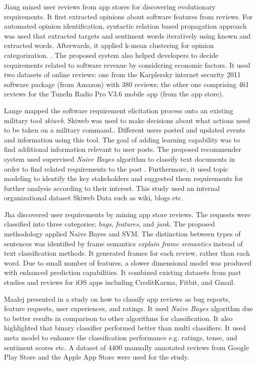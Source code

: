 	Jiang \etal \cite{Jiang:2014} mined user reviews from 
app stores for discovering evolutionary requirements. It first extracted opinions about software features from reviews. For automated opinion identification, syntactic
relation based propagation approach was used that extracted targets and sentiment words
iteratively using known and extracted words. Afterwards, it applied k-mean clustering for opinion categorization.
. The proposed system also helped developers to decide requirements related to software revenue by considering economic factors.  It used two datasets of online reviews: one from the
Karplersky internet security 2011 software package (from Amazon) with 380
reviews; the other one comprising 461 reviews for the  TuneIn Radio Pro V3.6
mobile app (from the app store).

	Lange \etal\cite{Douglas:S2008} mapped the software requirement elicitation
process onto an existing military tool \emph{skiweb}. Skiweb was used to make decisions about what actions need to be taken on a military command.. Different users posted and updated events and information using this tool. The goal of adding learning capability was to find additional information relevant to user posts. The proposed recommender system used supervised
\emph{Naive Bayes} algorithm to classify text documents in order to find related
requirements to the post . Furthermore, it
 used topic modeling to identify the key
stakeholders and suggested them requirements for further analysis according to their interest. This study used an internal organizational
dataset Skiweb Data such as wiki, blogs etc.

	Jha \etal \cite{Jha:2017} discovered user requirements by mining app store reviews. The requests were classified into three categories;
\emph{bugs}, \emph{features}, and \emph{junk}. The proposed methodology applied Naive Bayes and SVM. The distinction between types of sentences was identified by frame semantics \emph{explain frame semantics} instead of text classification methods. It generated frames for each review, rather than each word. Due to small number of features, a slower dimensional model was produced with enhanced prediction capabilities. It combined existing
datasets from past studies and reviews for iOS apps including CreditKarma,
Fitbit, and Gmail.

	Maalej presented in \cite{Maalej} a study on how to classify app reviews as bug
reports, feature requests, user experiences, and ratings. It used
\emph{Naive Bayes} algorithm due to better results in comparison to other algorithms for classification. It also highlighted that binary
classifier performed better than multi
classifiers. It used meta model to enhance the classification performance e.g. ratings,
tense, and sentiment scores etc. A
dataset of 4400 manually annotated reviews from Google Play Store and the Apple App
Store were used for the study.

